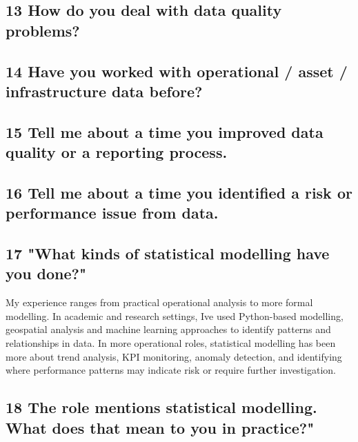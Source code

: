 \documentclass[
  letterpaper,
]{scrbook}
\begin{document}
\subsection{13 How do you deal with data quality
problems?}\label{how-do-you-deal-with-data-quality-problems}

\subsection{14 Have you worked with operational / asset / infrastructure
data
before?}\label{have-you-worked-with-operational-asset-infrastructure-data-before}

\subsection{15 Tell me about a time you improved data quality or a
reporting
process.}\label{tell-me-about-a-time-you-improved-data-quality-or-a-reporting-process.}

\subsection{16 Tell me about a time you identified a risk or performance
issue from
data.}\label{tell-me-about-a-time-you-identified-a-risk-or-performance-issue-from-data.}

\subsection{17 "What kinds of statistical modelling have you
done?"}\label{what-kinds-of-statistical-modelling-have-you-done}

My experience ranges from practical operational analysis to more formal
modelling. In academic and research settings, I\textquotesingle ve used
Python-based modelling, geospatial analysis and machine learning
approaches to identify patterns and relationships in data. In more
operational roles, statistical modelling has been more about trend
analysis, KPI monitoring, anomaly detection, and identifying where
performance patterns may indicate risk or require further investigation.

\subsection{\texorpdfstring{18 \textbf{The role mentions statistical
modelling. What does that mean to you in
practice?"}}{18 The role mentions statistical modelling. What does that mean to you in practice?"}}\label{the-role-mentions-statistical-modelling.-what-does-that-mean-to-you-in-practice}
\end{document}
